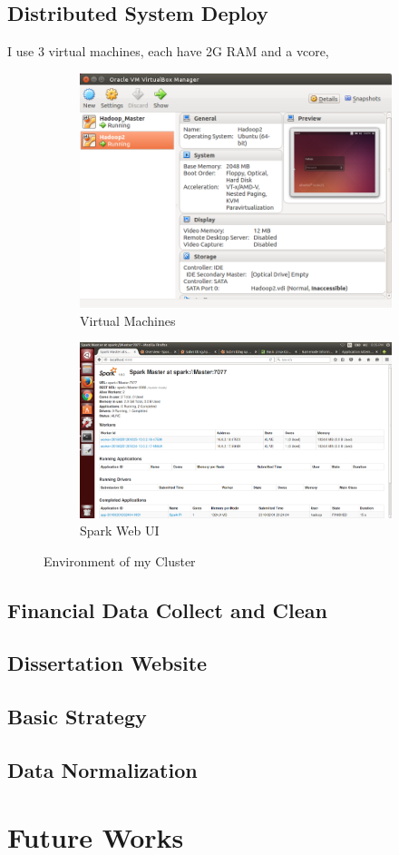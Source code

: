\documentclass[12pt,a4paper]{scrartcl}
\begin{document}
	\subsection{Distributed System Deploy}
	I use 3 virtual machines, each have 2G RAM and a vcore,
	\begin{figure}[h]
		\centering
		\begin{subfigure}{.5\textwidth}
			\centering
			\includegraphics[width=.8\linewidth]{environments}
			\caption{Virtual Machines}
			\label{fig:vm}
		\end{subfigure}%
		\begin{subfigure}{.5\textwidth}
			\centering
			\includegraphics[width=.8\linewidth]{spark_deploy}
			\caption{Spark Web UI}
			\label{fig:spark}
		\end{subfigure}
		\caption{Environment of my Cluster}
		\label{fig:environment}
	\end{figure} 
	\subsection{Financial Data Collect and Clean}
	\subsection{Dissertation Website}
	\subsection{Basic Strategy}
	\subsection{Data Normalization}
	\section{Future Works}
	
\end{document}
